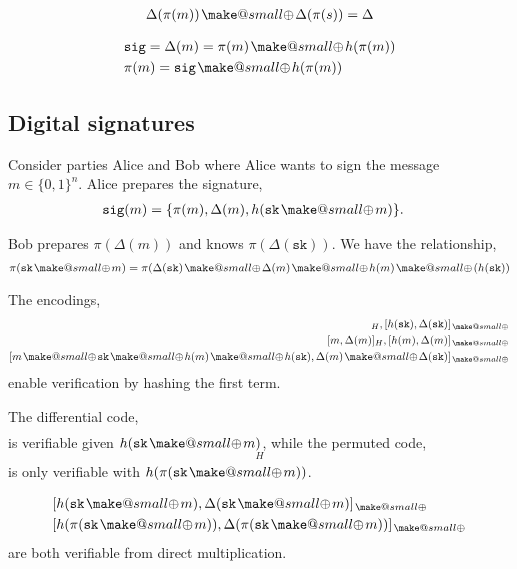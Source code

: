 \documentclass[twocolumn, aps, amsmath, amssymb, nofootinbib, superscriptaddress, longbibliography, doublefloatfix, table-of-contents, eqsecnum, rmp]{revtex4-2}
\makeatletter
\newcommand{\soplus}{{{\hspace{1pt}}{\mathbin{\mathpalette\make@small\oplus}}}{\hspace{1pt}}}
\newcommand{\make@small}[2]{%
  \vcenter{\hbox{%
    \scalebox{0.6}{$\m@th#1#2$}%
  }}%
}
\makeatother
\begin{document}
\begin{align}
	\Delta(\pi(m))\soplus \Delta(\pi(s))	= \Delta
\end{align}


\begin{align}
	&\mathtt{sig} = \Delta(m) = \pi(m) \soplus h(\pi(m)) \nonumber\\
	&\pi(m) = \mathtt{sig} \soplus h(\pi(m)) 
\end{align}

\subsection{Digital signatures}

Consider parties Alice and Bob where Alice wants to sign the message \mbox{$m\in \{0,1\}^n$}. Alice prepares the signature,
\begin{align}
	\mathtt{sig}(m) &= \{\pi(m), \Delta(m), h(\mathtt{sk} \soplus m)\}.
\end{align}

Bob prepares $\pi(\Delta(m))$ and knows $\pi(\Delta(\mathtt{sk}))$. We have the relationship,
\begin{align}
	\pi(\mathtt{sk} \soplus m) = \pi(\Delta(\mathtt{sk}) \soplus \Delta(m) \soplus h(m) \soplus(h(\mathtt{sk}))%
\end{align}

The encodings,
\begin{align}
	[\mathtt{sk}, \Delta(\mathtt{sk})]_H, [h(\mathtt{sk}), \Delta(\mathtt{sk})]_\soplus \nonumber\\
	[m, \Delta(m)]_H, [h(m), \Delta(m)]_\soplus \nonumber\\
	[m \soplus \mathtt{sk} \soplus h(m) \soplus h(\mathtt{sk}), \Delta(m) \soplus \Delta(\mathtt{sk})]_\soplus
\end{align}
enable verification by hashing the first term.

The differential code,
\begin{align}
	[\mathtt{sk} \soplus m, \Delta(\mathtt{sk} \soplus m)] %
\end{align}
is verifiable given $h(\mathtt{sk} \soplus m)$, while the permuted code,
\begin{align}
	[\pi(\mathtt{sk} \soplus m), \Delta(\pi(\mathtt{sk} \soplus m))]_H 
\end{align}
is only verifiable with $h(\pi(\mathtt{sk} \soplus m))$.

\begin{align}
	&[h(\mathtt{sk} \soplus m), \Delta(\mathtt{sk} \soplus m)]_\soplus \nonumber\\
	&[h(\pi(\mathtt{sk} \soplus m)), \Delta(\pi(\mathtt{sk} \soplus m))]_\soplus
\end{align}
are both verifiable from direct multiplication.
\end{document}
